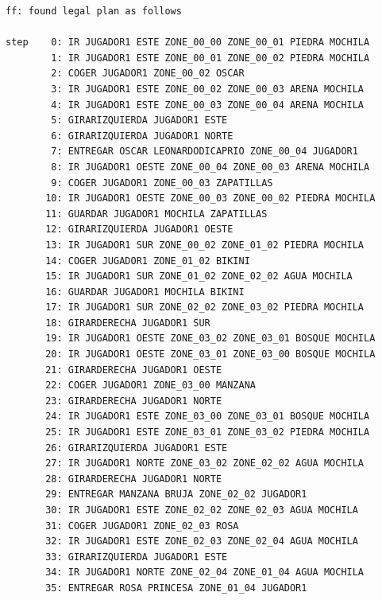 \documentclass[12pt]{article}
\begin{document}
\begin{verbatim}
ff: found legal plan as follows

step    0: IR JUGADOR1 ESTE ZONE_00_00 ZONE_00_01 PIEDRA MOCHILA
        1: IR JUGADOR1 ESTE ZONE_00_01 ZONE_00_02 PIEDRA MOCHILA
        2: COGER JUGADOR1 ZONE_00_02 OSCAR
        3: IR JUGADOR1 ESTE ZONE_00_02 ZONE_00_03 ARENA MOCHILA
        4: IR JUGADOR1 ESTE ZONE_00_03 ZONE_00_04 ARENA MOCHILA
        5: GIRARIZQUIERDA JUGADOR1 ESTE
        6: GIRARIZQUIERDA JUGADOR1 NORTE
        7: ENTREGAR OSCAR LEONARDODICAPRIO ZONE_00_04 JUGADOR1
        8: IR JUGADOR1 OESTE ZONE_00_04 ZONE_00_03 ARENA MOCHILA
        9: COGER JUGADOR1 ZONE_00_03 ZAPATILLAS
       10: IR JUGADOR1 OESTE ZONE_00_03 ZONE_00_02 PIEDRA MOCHILA
       11: GUARDAR JUGADOR1 MOCHILA ZAPATILLAS
       12: GIRARIZQUIERDA JUGADOR1 OESTE
       13: IR JUGADOR1 SUR ZONE_00_02 ZONE_01_02 PIEDRA MOCHILA
       14: COGER JUGADOR1 ZONE_01_02 BIKINI
       15: IR JUGADOR1 SUR ZONE_01_02 ZONE_02_02 AGUA MOCHILA
       16: GUARDAR JUGADOR1 MOCHILA BIKINI
       17: IR JUGADOR1 SUR ZONE_02_02 ZONE_03_02 PIEDRA MOCHILA
       18: GIRARDERECHA JUGADOR1 SUR
       19: IR JUGADOR1 OESTE ZONE_03_02 ZONE_03_01 BOSQUE MOCHILA
       20: IR JUGADOR1 OESTE ZONE_03_01 ZONE_03_00 BOSQUE MOCHILA
       21: GIRARDERECHA JUGADOR1 OESTE
       22: COGER JUGADOR1 ZONE_03_00 MANZANA
       23: GIRARDERECHA JUGADOR1 NORTE
       24: IR JUGADOR1 ESTE ZONE_03_00 ZONE_03_01 BOSQUE MOCHILA
       25: IR JUGADOR1 ESTE ZONE_03_01 ZONE_03_02 PIEDRA MOCHILA
       26: GIRARIZQUIERDA JUGADOR1 ESTE
       27: IR JUGADOR1 NORTE ZONE_03_02 ZONE_02_02 AGUA MOCHILA
       28: GIRARDERECHA JUGADOR1 NORTE
       29: ENTREGAR MANZANA BRUJA ZONE_02_02 JUGADOR1
       30: IR JUGADOR1 ESTE ZONE_02_02 ZONE_02_03 AGUA MOCHILA
       31: COGER JUGADOR1 ZONE_02_03 ROSA
       32: IR JUGADOR1 ESTE ZONE_02_03 ZONE_02_04 AGUA MOCHILA
       33: GIRARIZQUIERDA JUGADOR1 ESTE
       34: IR JUGADOR1 NORTE ZONE_02_04 ZONE_01_04 AGUA MOCHILA
       35: ENTREGAR ROSA PRINCESA ZONE_01_04 JUGADOR1

\end{verbatim}
\end{document}
